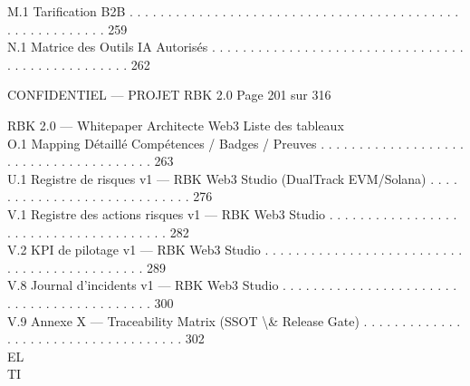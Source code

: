\documentclass[12pt,landscape,a4paper]{article}
\newenvironment{confidential}
{\begin{tcolorbox}[
    colback=rbkred!5!white,
    colframe=rbkred!75!black,
    title=CONFIDENTIEL,
    fonttitle=\bfseries\color{white},
    coltitle=rbkred!75!black,
    breakable,
    enhanced,
    frame hidden,
    borderline west={2pt}{0pt}{rbkred!75!black}
]}
{\end{tcolorbox}}
\begin{document}
\vspace{0.5em}
M.1 Tarification B2B    . . . . . . . . . . . . . . . . . . . . . . . . . . . . . . . . . . . . . . . . . . . . . . . . . . . . . . . . 259\\
\vspace{0.5em}
N.1 Matrice des Outils IA Autorisés . . . . . . . . . . . . . . . . . . . . . . . . . . . . . . . . . . . . . . . . . . . . . . . . . 262\\
\vspace{0.5em}
\vspace{0.5em}
\vspace{0.5em}
\begin{confidential}CONFIDENTIEL — PROJET RBK 2.0                                 Page 201 sur 316\end{confidential}
RBK 2.0 — Whitepaper Architecte Web3                                                                                      Liste des tableaux\\
\vspace{0.5em}
\vspace{0.5em}
O.1 Mapping Détaillé Compétences / Badges / Preuves . . . . . . . . . . . . . . . . . . . . . . . . . . . . . . . . . . . . . . 263\\
\vspace{0.5em}
U.1 Registre de risques v1 — RBK Web3 Studio (DualTrack EVM/Solana)          . . . . . . . . . . . . . . . . . . . . . . . . . . . . 276\\
\vspace{0.5em}
V.1   Registre des actions risques v1 — RBK Web3 Studio . . . . . . . . . . . . . . . . . . . . . . . . . . . . . . . . . . . . . . 282\\
V.2   KPI de pilotage v1 — RBK Web3 Studio . . . . . . . . . . . . . . . . . . . . . . . . . . . . . . . . . . . . . . . . . . . . 289\\
V.8   Journal d’incidents v1 — RBK Web3 Studio . . . . . . . . . . . . . . . . . . . . . . . . . . . . . . . . . . . . . . . . . . 300\\
V.9   Annexe X — Traceability Matrix (SSOT \textbackslash{}& Release Gate) . . . . . . . . . . . . . . . . . . . . . . . . . . . . . . . . . . . . 302\\
\vspace{0.5em}
\vspace{0.5em}
\vspace{0.5em}
\vspace{0.5em}
EL\\
TI\\
\end{document}
